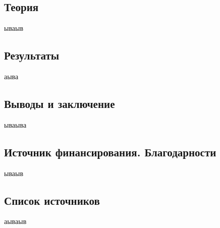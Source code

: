 \documentclass{article}%
\begin{document}
%
\subsection*{Теория}%
\label{subsec:}%

%
ываыв%
\subsection*{Результаты}%
\label{subsec:}%

%
аыва%
\subsection*{Выводы и заключение}%
\label{subsec:}%

%
ываыва%
\subsection*{Источник финансирования. Благодарности}%
\label{subsec:.}%

%
ываыв%
\subsection*{Список источников}%
\label{subsec:}%

%
аываыв%
\end{document}
